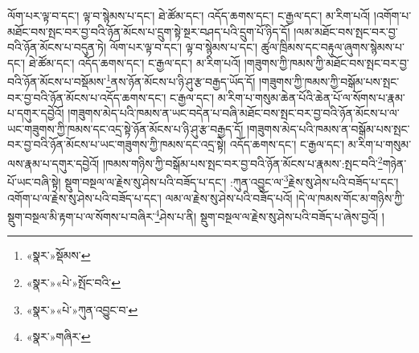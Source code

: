 ལོག་པར་ལྟ་བ་དང་། ལྟ་བ་སྙེམས་པ་དང་། ཐེ་ཚོམ་དང་། འདོད་ཆགས་དང་། ང་རྒྱལ་དང་། མ་རིག་པའོ། །འགོག་པ་མཐོང་བས་སྤང་བར་བྱ་བའི་ཉོན་མོངས་པ་དྲུག་སྟེ་སྔར་བཤད་པའི་དྲུག་པོ་ཉིད་དོ། །ལམ་མཐོང་བས་སྤང་བར་བྱ་བའི་ཉོན་མོངས་པ་བདུན་ཏེ། ལོག་པར་ལྟ་བ་དང་། ལྟ་བ་སྙེམས་པ་དང་། ཚུལ་ཁྲིམས་དང་བརྟུལ་ཞུགས་སྙེམས་པ་དང་། ཐེ་ཚོམ་དང་། འདོད་ཆགས་དང་། ང་རྒྱལ་དང་། མ་རིག་པའོ། །གཟུགས་ཀྱི་ཁམས་ཀྱི་མཐོང་བས་སྤང་བར་བྱ་བའི་ཉོན་མོངས་པ་བསྡོམས་\footnote{«སྣར་»སྡོམས་}ནས་ཉོན་མོངས་པ་ཉི་ཤུ་རྩ་བརྒྱད་ཡོད་དོ། །གཟུགས་ཀྱི་ཁམས་ཀྱི་བསྒོམ་པས་སྤང་བར་བྱ་བའི་ཉོན་མོངས་པ་འདོད་ཆགས་དང་། ང་རྒྱལ་དང་། མ་རིག་པ་གསུམ་ཆེན་པོའི་ཆེན་པོ་ལ་སོགས་པ་རྣམ་པ་དགུར་དབྱེའོ། །གཟུགས་མེད་པའི་ཁམས་ན་ཡང་བདེན་པ་བཞི་མཐོང་བས་སྤང་བར་བྱ་བའི་ཉོན་མོངས་པ་ལ་ཡང་གཟུགས་ཀྱི་ཁམས་དང་འདྲ་སྟེ་ཉོན་མོངས་པ་ཉི་ཤུ་རྩ་བརྒྱད་དོ། །གཟུགས་མེད་པའི་ཁམས་ན་བསྒོམ་པས་སྤང་བར་བྱ་བའི་ཉོན་མོངས་པ་ཡང་གཟུགས་ཀྱི་ཁམས་དང་འདྲ་སྟེ། འདོད་ཆགས་དང་། ང་རྒྱལ་དང་། མ་རིག་པ་གསུམ་ལས་རྣམ་པ་དགུར་དབྱེའོ། །ཁམས་གཉིས་ཀྱི་བསྒོམ་པས་སྤང་བར་བྱ་བའི་ཉོན་མོངས་པ་རྣམས་:སྤང་བའི་\footnote{«སྣར་»«པེ་»སྤོང་བའི་}གཉེན་པོ་ཡང་བཞི་སྟེ། སྡུག་བསྔལ་ལ་རྗེས་སུ་ཤེས་པའི་བཟོད་པ་དང་། :ཀུན་འབྱུང་ལ་\footnote{«སྣར་»«པེ་»ཀུན་འབྱུང་བ་}རྗེས་སུ་ཤེས་པའི་བཟོད་པ་དང་། འགོག་པ་ལ་རྗེས་སུ་ཤེས་པའི་བཟོད་པ་དང་། ལམ་ལ་རྗེས་སུ་ཤེས་པའི་བཟོད་པའོ། །དེ་ལ་ཁམས་གོང་མ་གཉིས་ཀྱི་སྡུག་བསྔལ་མི་རྟག་པ་ལ་སོགས་པ་བཞིར་\footnote{«སྣར་»གཞིར་}ཤེས་པ་ནི། སྡུག་བསྔལ་ལ་རྗེས་སུ་ཤེས་པའི་བཟོད་པ་ཞེས་བྱའོ། །
